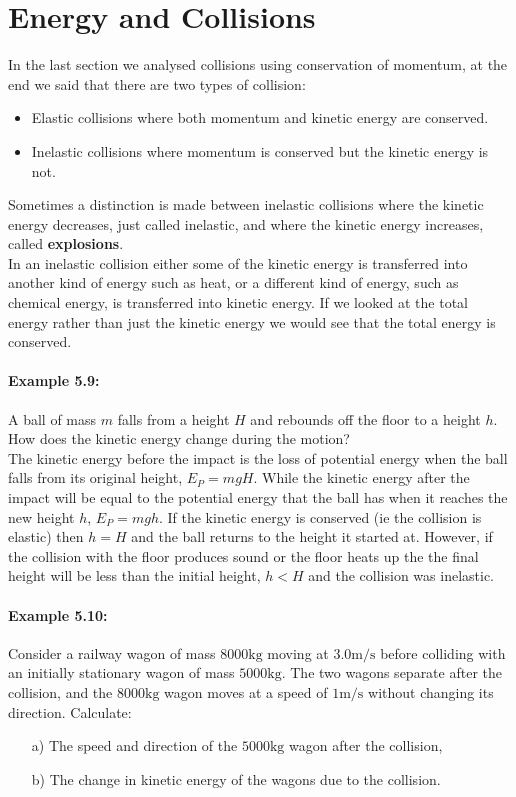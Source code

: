 \documentclass[a4paper,12pt]{book}
\begin{document}
\section{Energy and Collisions}
In the last section we analysed collisions using conservation of momentum, at the end we said that there are two types of collision:
\begin{itemize}
\setlength{\itemsep}{-5pt}
    \item Elastic collisions where both momentum and kinetic energy are conserved.
    \item Inelastic collisions where momentum is conserved but the kinetic energy is not.
\end{itemize} 
Sometimes a distinction is made between inelastic collisions where the kinetic energy decreases, just called inelastic, and where the kinetic energy increases, called \textbf{explosions}. \\

In an inelastic collision either some of the kinetic energy is transferred into another kind of energy such as heat, or a different kind of energy, such as chemical energy, is transferred into kinetic energy. If we looked at the total energy rather than just the kinetic energy we would see that the total energy is conserved.\\

\paragraph{Example 5.9:} A ball of mass $m$ falls from a height $H$ and rebounds off the floor to a height $h$. How does the kinetic energy change during the motion?\\

The kinetic energy before the impact is the loss of potential energy when the ball falls from its original height, $E_{P}=mgH$. While the kinetic energy after the impact will be equal to the potential energy that the ball has when it reaches the new height $h$, $E_{P}=mgh$. If the kinetic energy is conserved (ie the collision is elastic) then $h=H$ and the ball returns to the height it started at. However, if the collision with the floor produces sound or the floor heats up the the final height will be less than the initial height, $h<H$ and the collision was inelastic.

\paragraph{Example 5.10:} Consider a railway wagon of mass $8000\text{kg}$ moving at $3.0\text{m/s}$ before colliding with an initially stationary wagon of mass $5000\text{kg}$. The two wagons separate after the collision, and the $8000\text{kg}$ wagon moves at a speed of $1\text{m/s}$ without changing its direction. Calculate:
\begin{itemize}
\setlength{\itemsep}{-5pt}
    \item[a)] The speed and direction of the $5000\text{kg}$ wagon after the collision,
    \item[b)] The change in kinetic energy of the wagons due to the collision.
\end{itemize} 
\end{document}
